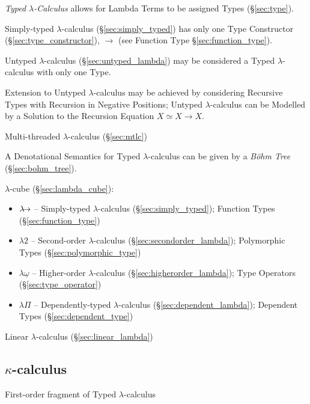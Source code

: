 \emph{Typed $\lambda$-Calculus} allows for Lambda Terms to be assigned
Types (\S\ref{sec:type}).

Simply-typed $\lambda$-calculus (\S\ref{sec:simply_typed}) has only
one Type Constructor (\S\ref{sec:type_constructor}), $\rightarrow$
(see Function Type \S\ref{sec:function_type}).

Untyped $\lambda$-calculus (\S\ref{sec:untyped_lambda}) may be
considered a Typed $\lambda$-calculus with only one Type.

Extension to Untyped $\lambda$-calculus may be achieved by
considering Recursive Types with Recursion in Negative Positions;
Untyped $\lambda$-calculus can be Modelled by a Solution to the
Recursion Equation $X \simeq X \rightarrow X$. \cite{wadler12}

\fist Multi-threaded $\lambda$-calculus (\S\ref{sec:mtlc})

A Denotational Semantics for Typed $\lambda$-calculus can be given by a
\emph{B\"ohm Tree} (\S\ref{sec:bohm_tree}).

$\lambda$-cube (\S\ref{sec:lambda_cube}):
\begin{itemize}
  \item $\lambda\kern-5pt\rightarrow$ -- Simply-typed
    $\lambda$-calculus (\S\ref{sec:simply_typed}); Function Types
    (\S\ref{sec:function_type})
  \item $\lambda2$ -- Second-order $\lambda$-calculus
    (\S\ref{sec:secondorder_lambda}); Polymorphic Types
    (\S\ref{sec:polymorphic_type})
  \item $\lambda\underline{\omega}$ -- Higher-order $\lambda$-calculus
    (\S\ref{sec:higherorder_lambda}); Type Operators
    (\S\ref{sec:type_operator})
  \item $\lambda\Pi$ -- Dependently-typed $\lambda$-calculus
    (\S\ref{sec:dependent_lambda}); Dependent Types
    (\S\ref{sec:dependent_type})
\end{itemize}

Linear $\lambda$-calculus (\S\ref{sec:linear_lambda})



\subsection{$\kappa$-calculus}\label{sec:kappa_calculus}

First-order fragment of Typed $\lambda$-calculus



